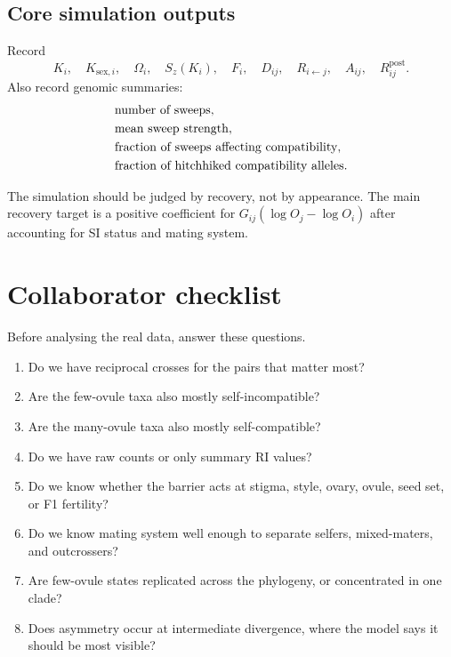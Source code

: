\documentclass[12pt]{article}
\newcommand{\Rpost}{R^{\mathrm{post}}}
\begin{document}
\subsection{Core simulation outputs}

Record
\begin{equation}
K_i,\quad K_{\mathrm{sex},i},\quad \Omega_i,\quad S_z(K_i),\quad F_i,\quad D_{ij},\quad R_{i\leftarrow j},\quad A_{ij},\quad \Rpost_{ij}.
\end{equation}
Also record genomic summaries:
\begin{align*}
&\hbox{number of sweeps},\\
&\hbox{mean sweep strength},\\
&\hbox{fraction of sweeps affecting compatibility},\\
&\hbox{fraction of hitchhiked compatibility alleles}.
\end{align*}

\begin{conclusionbox}
The simulation should be judged by recovery, not by appearance. The main recovery target is a positive coefficient for $G_{ij}(\log O_j-\log O_i)$ after accounting for SI status and mating system.
\end{conclusionbox}

\section{Collaborator checklist}

Before analysing the real data, answer these questions.

\begin{enumerate}
\item Do we have reciprocal crosses for the pairs that matter most?
\item Are the few-ovule taxa also mostly self-incompatible?
\item Are the many-ovule taxa also mostly self-compatible?
\item Do we have raw counts or only summary RI values?
\item Do we know whether the barrier acts at stigma, style, ovary, ovule, seed set, or F1 fertility?
\item Do we know mating system well enough to separate selfers, mixed-maters, and outcrossers?
\item Are few-ovule states replicated across the phylogeny, or concentrated in one clade?
\item Does asymmetry occur at intermediate divergence, where the model says it should be most visible?
\end{enumerate}
\end{document}
